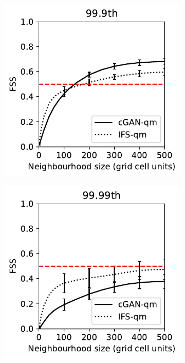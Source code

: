 \documentclass{article}
\begin{document}
\begin{figure}[t]
\begin{subfigure}[t]{0.32\textwidth}
     \caption{}
     \end{subfigure}
     \begin{subfigure}[t]{0.32\textwidth}
     \includegraphics[width=\textwidth]{images/fss_q99.9th_final-nologs_217600.pdf}
     \caption{}
     \end{subfigure}
     \begin{subfigure}[t]{0.32\textwidth}
     \includegraphics[width=\textwidth]{images/fss_q99.99th_final-nologs_217600.pdf}

\end{subfigure}
\end{figure}
\end{document}
